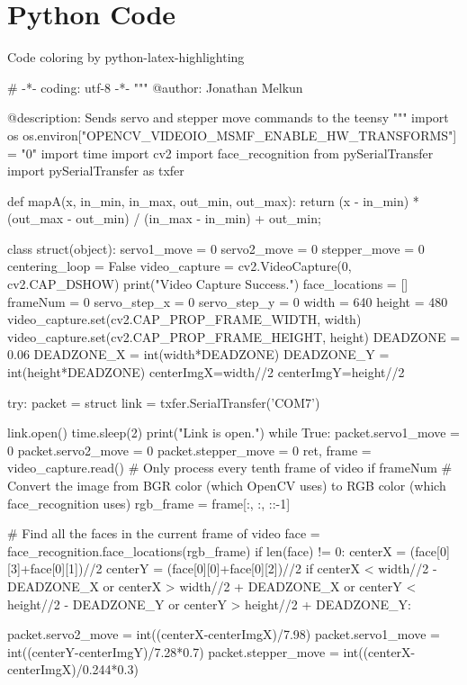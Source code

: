 \chapter{Python Code}
\label{ch:python-code}
Code coloring by python-latex-highlighting \cite{verdierPythonHighlightingLaTeX2023}
\begin{python}
# -*- coding: utf-8 -*-
"""
@author: Jonathan Melkun

@description: Sends servo and stepper move commands to the teensy
"""
import os
os.environ["OPENCV_VIDEOIO_MSMF_ENABLE_HW_TRANSFORMS"] = "0"
import time
import cv2
import face_recognition
from pySerialTransfer import pySerialTransfer as txfer

def mapA(x, in_min, in_max, out_min, out_max):
  return (x - in_min) * (out_max - out_min) / (in_max - in_min) + out_min;

class struct(object):
    servo1_move = 0
    servo2_move = 0
    stepper_move = 0
centering_loop = False
video_capture = cv2.VideoCapture(0, cv2.CAP_DSHOW)
print("Video Capture Success.")
face_locations = []
frameNum = 0
servo_step_x = 0
servo_step_y = 0
width = 640
height = 480
video_capture.set(cv2.CAP_PROP_FRAME_WIDTH, width)
video_capture.set(cv2.CAP_PROP_FRAME_HEIGHT, height)
DEADZONE = 0.06
DEADZONE_X = int(width*DEADZONE)
DEADZONE_Y = int(height*DEADZONE)
centerImgX=width//2
centerImgY=height//2

try:
    packet = struct
    link = txfer.SerialTransfer('COM7')

    link.open()
    time.sleep(2)
    print("Link is open.")
    while True:
        packet.servo1_move = 0
        packet.servo2_move = 0
        packet.stepper_move = 0
        ret, frame = video_capture.read()
        # Only process every tenth frame of video
        if frameNum %
            # Convert the image from BGR color (which OpenCV uses) to RGB color (which face_recognition uses)
            rgb_frame = frame[:, :, ::-1]

            # Find all the faces in the current frame of video
            face = face_recognition.face_locations(rgb_frame)
            if len(face) != 0:
                centerX = (face[0][3]+face[0][1])//2
                centerY = (face[0][0]+face[0][2])//2
                if centerX < width//2 - DEADZONE_X or centerX > width//2 + DEADZONE_X or centerY < height//2 - DEADZONE_Y or centerY > height//2 + DEADZONE_Y:


                    packet.servo2_move = int((centerX-centerImgX)/7.98)
                    packet.servo1_move = int((centerY-centerImgY)/7.28*0.7)
                    packet.stepper_move = int((centerX-centerImgX)/0.244*0.3)


\end{python}
